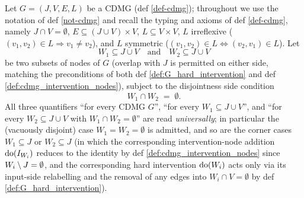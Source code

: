 \documentclass[main]{subfiles}
\begin{document}
\def\rowref{claim\_3\_14}
\label{claim_3_14}

\begin{Lem}\label{adding-intervention-nodes-commutes-with-disjoint-hard-interventions}
    Let $G = (J, V, E, L)$ be a CDMG (def \ref{def-cdmg}); throughout we use the notation of def \ref{not-cdmg} and recall the typing and axioms of def \ref{def-cdmg}, namely $J \cap V = \emptyset$, $E \subseteq (J \cup V) \times V$, $L \subseteq V \times V$, $L$ irreflexive ($(v_1, v_2) \in L \Rightarrow v_1 \neq v_2$), and $L$ symmetric ($(v_1, v_2) \in L \Leftrightarrow (v_2, v_1) \in L$). Let
    \[ W_1 \subseteq J \cup V \quad\text{and}\quad W_2 \subseteq J \cup V \]
    be two subsets of nodes of $G$ (overlap with $J$ is permitted on either side, matching the preconditions of both def \ref{def:G_hard_intervention} and def \ref{def:cdmg_intervention_nodes}), subject to the disjointness side condition
    \[ W_1 \cap W_2 \;=\; \emptyset. \]
    All three quantifiers ``for every CDMG $G$'', ``for every $W_1 \subseteq J \cup V$'', and ``for every $W_2 \subseteq J \cup V$ with $W_1 \cap W_2 = \emptyset$'' are read \emph{universally}; in particular the (vacuously disjoint) case $W_1 = W_2 = \emptyset$ is admitted, and so are the corner cases $W_1 \subseteq J$ or $W_2 \subseteq J$ (in which the corresponding intervention-node addition $\operatorname{do}(I_{W_i})$ reduces to the identity by def \ref{def:cdmg_intervention_nodes} since $W_i \setminus J = \emptyset$, and the corresponding hard intervention $\operatorname{do}(W_i)$ acts only via its input-side relabelling and the removal of any edges into $W_i \cap V = \emptyset$ by def \ref{def:G_hard_intervention}).


\end{Lem}
\end{document}

